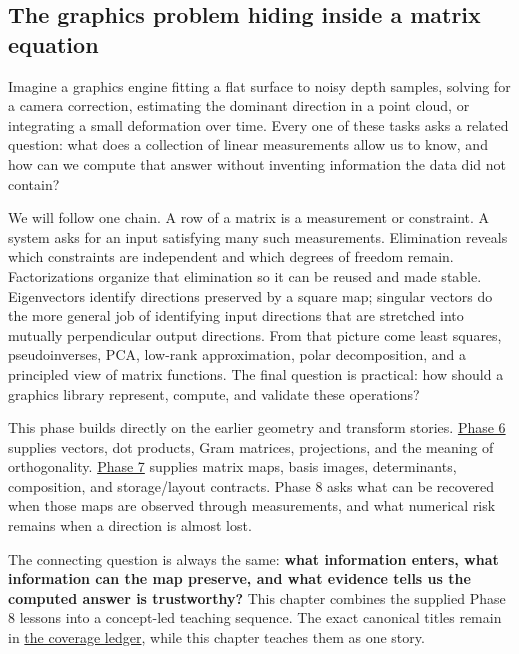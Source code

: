 \subsection{The graphics problem hiding inside a matrix equation}\label{01-foundations-i-ch019-the-graphics-problem-hiding-inside-a-matrix-equation}

Imagine a graphics engine fitting a flat surface to noisy depth samples, solving for a camera correction, estimating the dominant direction in a point cloud, or integrating a small deformation over time. Every one of these tasks asks a related question: what does a collection of linear measurements allow us to know, and how can we compute that answer without inventing information the data did not contain?

We will follow one chain. A row of a matrix is a measurement or constraint. A system asks for an input satisfying many such measurements. Elimination reveals which constraints are independent and which degrees of freedom remain. Factorizations organize that elimination so it can be reused and made stable. Eigenvectors identify directions preserved by a square map; singular vectors do the more general job of identifying input directions that are stretched into mutually perpendicular output directions. From that picture come least squares, pseudoinverses, PCA, low-rank approximation, polar decomposition, and a principled view of matrix functions. The final question is practical: how should a graphics library represent, compute, and validate these operations?

This phase builds directly on the earlier geometry and transform stories. \hyperref[01-foundations-i-ch017-the-panel-gives-us-a-reason-to-learn]{Phase 6} supplies vectors, dot products, Gram matrices, projections, and the meaning of orthogonality. \hyperref[01-foundations-i-ch018-keep-the-promises-visible-while-moving-between-representations]{Phase 7} supplies matrix maps, basis images, determinants, composition, and storage/layout contracts. Phase 8 asks what can be recovered when those maps are observed through measurements, and what numerical risk remains when a direction is almost lost.

The connecting question is always the same: \textbf{what information enters, what information can the map preserve, and what evidence tells us the computed answer is trustworthy?} This chapter combines the supplied Phase 8 lessons into a concept-led teaching sequence. The exact canonical titles remain in \hyperref[appendix-fd090d982a15-phase-8---parts-701-800]{the coverage ledger}, while this chapter teaches them as one story.

